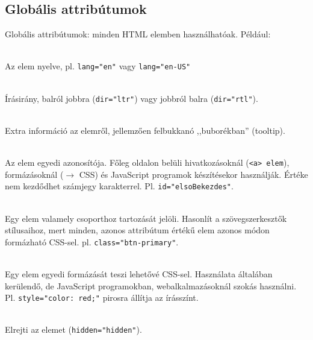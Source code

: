 \subsection{Globális attribútumok}

\begin{frame}
  Globális attribútumok: minden HTML elemben használhatóak. Például:
  \begin{description}[m]
    \item[\texttt{lang}] \hfill \\ Az elem nyelve, pl. \texttt{lang="en"} vagy \texttt{lang="en-US"}
    \item[\texttt{dir}] \hfill \\ Írásirány, balról jobbra (\texttt{dir="ltr"}) vagy jobbról balra (\texttt{dir="rtl"}).
    \item[\texttt{title}] \hfill \\ Extra információ az elemről, jellemzően felbukkanó ,,buborékban'' (tooltip).
  \end{description}
\end{frame}

\begin{frame}
  \begin{description}[m]
    \small
    \item[\texttt{id}] \hfill \\ Az elem egyedi azonosítója. Főleg oldalon belüli hivatkozásoknál (\texttt{<a> elem}), formázásoknál ($\to$ CSS) és JavaScript programok készítésekor használják. Értéke nem kezdődhet számjegy karakterrel. Pl. \texttt{id="elsoBekezdes"}.
    \item[\texttt{class}] \hfill \\ Egy elem valamely csoporthoz tartozását jelöli. Hasonlít a szövegszerkesztők stílusaihoz, mert minden, azonos attribútum értékű elem azonos módon formázható CSS-sel. pl. \texttt{class="btn-primary"}.
    \item[\texttt{style}] \hfill \\ Egy elem egyedi formázását teszi lehetővé CSS-sel. Használata általában kerülendő, de JavaScript programokban, webalkalmazásoknál szokás használni. Pl. \texttt{style="color: red;"} pirosra állítja az írásszínt.
    \item[\texttt{hidden}] \hfill \\ Elrejti az elemet (\texttt{hidden="hidden"}).
  \end{description}
\end{frame}

